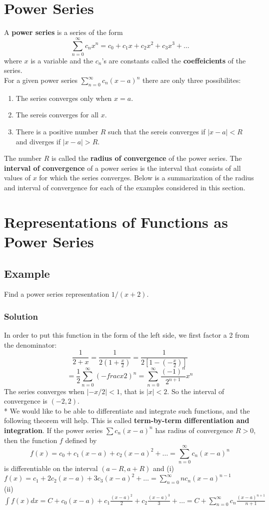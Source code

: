\section{Power Series}
A \textbf{power series} is a series of the form $$\sum^\infty_{n = 0}c_nx^n = c_0 + c_1x + c_2x^2 + c_3x^3 + \dots$$
where $x$ is a variable and the $c_n$'s are constants called the \textbf{coeffeicients} of the series.\\
For a given power series $\sum^\infty_{n = 0}c_n(x - a)^n$ there are only three possibilites:
\begin{enumerate}
    \item The series converges only when $x = a$.
    \item The sereis converges for all $x$.
    \item There is a positive number $R$ such that the sereis converges if $|x - a| < R$ and diverges if $|x - a| > R$.
\end{enumerate}
The number $R$ is called the \textbf{radius of convergence} of the power series. The \textbf{interval of convergence} of a power series is the interval that consists of all values of $x$ for which the series converges.
Below is a summarization of the radius and interval of convergence for each of the examples considered in this section.\\

\section{Representations of Functions as Power Series}
\subsection*{Example}
Find a power series representation $1/(x + 2)$.
\subsubsection*{Solution} In order to put this function in the form of the left side, we first factor a 2 from the denominator:
$$\frac{1}{2 + x} = \frac{1}{2(1 + \frac{x}{2})} = \frac{1}{2[1 - (-\frac{x}{2})]}$$ 
$$= \frac{1}{2}\sum^\infty_{n = 0}(-frac{x}{2})^n = \sum^\infty_{n = 0}\frac{(-1)^n}{2^{n + 1}}x^n $$
The series converges when $|-x/2| < 1$, that is $|x| < 2$. So the interval of convergence is $(-2,2)$.\\*
We would like to be able to differentiate and integrate such functions, and the following theorem will help. This is called \textbf{term-by-term differentiation and integration}.
If the power series $\textstyle\sum c_n(x-a)^n$ has radius of convergence $R > 0$, then the function $f$ defined by
$$f(x) = c_0 + c_1(x - a) + c_2(x - a)^2 + \dots = \sum^\infty_{n = 0}c_n(x - a)^n$$ is differentiable on the interval $(a - R, a + R)$ and
(i) $f(x) = c_1 + 2c_2(x - a) + 3c_3(x - a)^2 + \dots = \sum^\infty_{n = 0}nc_n(x-a)^{n - 1}$\\
(ii)$\int f(x) dx = C + c_0(x - a) + c_1\frac{(x-a)^2}{2} + c_2\frac{(x-a)^3}{3} + \dots = C + \sum^\infty_{n = 0} c_n\frac{(x-a)^{n + 1}}{n + 1}$

